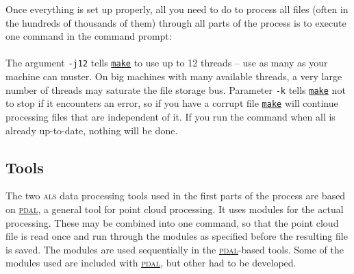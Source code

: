 \documentclass[english,a4paper,minion,nofigsidecaption]{article}
\newcommand{\als}{\textsc{als}}
\newcommand{\make}{\href{https://www.gnu.org/software/make/}{\texttt{make}}}
\newcommand{\pdal}{\href{https://www.pdal.io}{\textsc{pdal}}}
\begin{document}
Once everything is set up properly, all you need to do to process all files (often in the hundreds of thousands of them) through all parts of the process is to execute one command in the command prompt:
\\[0.25em]\mbox{}
\\[0.25em]The argument \texttt{-j12} tells {\make} to use up to 12 threads – use as many as your machine can muster. On big machines with many available threads, a very large number of threads may saturate the file storage bus. Parameter \texttt{-k} tells {\make} not to stop if it encounters an error, so if you have a corrupt file {\make} will continue processing files that are independent of it. If you run the command when all is already up-to-date, nothing will be done. 

\subsection{Tools}

The two {\als} data processing tools used in the first parts of the process are based on {\pdal}, a general tool for point cloud processing. It uses modules for the actual processing. These may be combined into one command, so that the point cloud file is read once and run through the modules as specified before the resulting file is saved. The modules are used sequentially in the {\pdal}-based tools. Some of the modules used are included with {\pdal}, but other had to be developed. 
\end{document}
